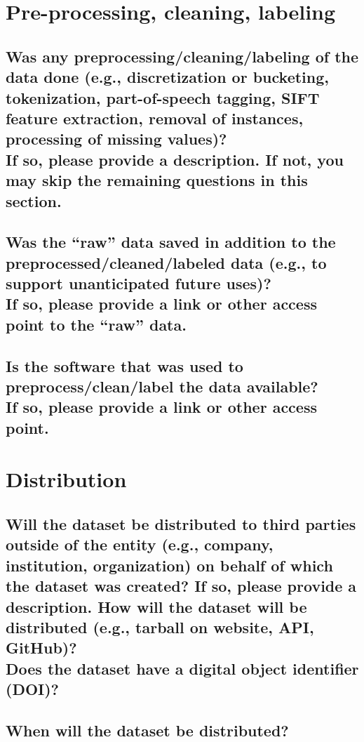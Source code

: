 \documentclass[letterpaper, 10 pt, conference]{ieeeconf}  %
\newcommand{\subtitle}[1]{{\\ \small \normalfont \color{purple} #1}}
\begin{document}
\section{Pre-processing, cleaning, labeling}

\subsection{Was any preprocessing/cleaning/labeling of the data done (e.g., discretization or bucketing, tokenization, part-of-speech tagging, SIFT feature extraction, removal of instances, processing of missing values)? \subtitle{If so, please provide a description. If not, you may skip the remaining questions in this section.}}

\lipsum[1]

\subsection{Was the “raw” data saved in addition to the preprocessed/cleaned/labeled data (e.g., to support unanticipated future uses)? \subtitle{If so, please provide a link or other access point to the “raw” data. }}

\lipsum[1]

\subsection{Is the software that was used to preprocess/clean/label the data available? \subtitle{If so, please provide a link or other access point.}}

\lipsum[1]

\section{Distribution}
\subsection{Will the dataset be distributed to third parties outside of the entity (e.g., company, institution, organization) on behalf of which the dataset was created? If so, please provide a description. How will the dataset will be distributed (e.g., tarball on website, API, GitHub)? \subtitle{Does the dataset have a digital object identifier (DOI)?}}

\lipsum[1]

\subsection{When will the dataset be distributed?}
\end{document}
